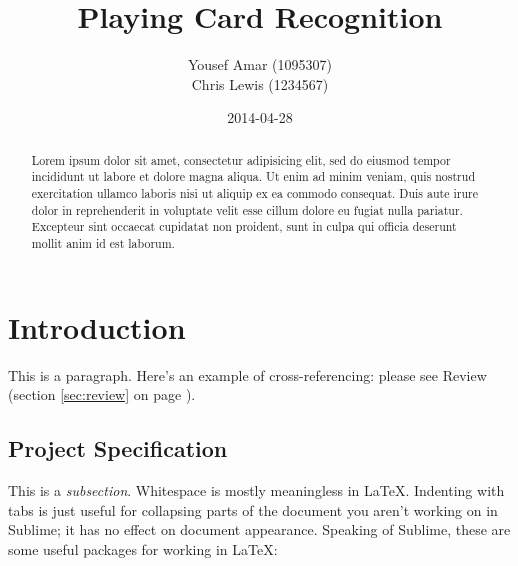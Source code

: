 \documentclass[a4paper,12pt,notitlepage]{article}
\begin{document}
\parskip 2mm

\title{{\huge Playing Card Recognition}\\}
\author{Yousef Amar (1095307)\\Chris Lewis (1234567)}
\date{2014-04-28}
\maketitle
\thispagestyle{empty}
\vfill
\begin{abstract}
	Lorem ipsum dolor sit amet, consectetur adipisicing elit, sed do eiusmod tempor incididunt ut labore et dolore magna aliqua. Ut enim ad minim veniam, quis nostrud exercitation ullamco laboris nisi ut aliquip ex ea commodo consequat. Duis aute irure dolor in reprehenderit in voluptate velit esse cillum dolore eu fugiat nulla pariatur. Excepteur sint occaecat cupidatat non proident, sunt in culpa qui officia deserunt mollit anim id est laborum.
\end{abstract}
\pagebreak

\tableofcontents
\thispagestyle{empty}
\pagebreak
\setcounter{page}{1}

\parskip 2mm

\section{Introduction}
	
	This is a paragraph. Here's an example of cross-referencing: please see Review (section \ref{sec:review} on page \pageref{sec:review}).

	\subsection{Project Specification}

		This is a \emph{subsection}. Whitespace is mostly meaningless in \LaTeX. Indenting with tabs is just useful for collapsing parts of the document you aren't working on in Sublime; it has no effect on document appearance. Speaking of Sublime, these are some useful packages for working in \LaTeX:
\end{document}

